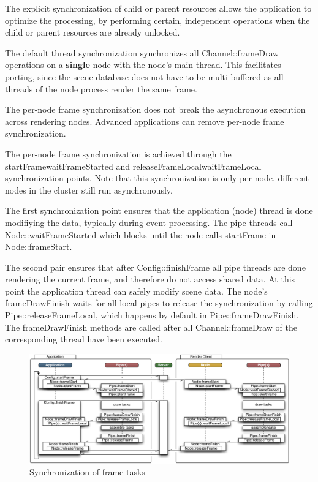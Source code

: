 \documentclass[10pt,a4]{scrartcl}
\begin{document}
The explicit synchronization of child or parent resources allows the
application to optimize the processing, by performing certain, independent
operations when the child or parent resources are already unlocked.

The default thread synchronization synchronizes all
\textsf{Channel::frameDraw} operations on a \textbf{single} node with
the node's main thread. This facilitates porting, since the scene
database does not have to be multi-buffered as all threads of the node
process render the same frame.

The per-node frame synchronization does not break the asynchronous
execution across rendering nodes.  Advanced applications can remove per-node
frame synchronization.

The per-node frame synchronization is achieved through the
\textsf{startFrame\textrightarrow wait\-Fra\-me\-Started} and
\textsf{releaseFrameLocal\textrightarrow waitFrameLocal} synchronization
points. Note that this synchronization is only per-node, different nodes
in the cluster still run asynchronously.

The first synchronization point ensures that the application (node)
thread is done modifiying the data, typically during event
processing. The pipe threads call \textsf{Node::waitFrameStarted} which
blocks until the node calls \textsf{startFrame} in
\textsf{Node::frame\-Start}.

The second pair ensures that after \textsf{Config::finishFrame} all pipe
threads are done rendering the current frame, and therefore do not
access shared data. At this point the application thread can safely
modify scene data. The node's \textsf{frameDrawFinish} waits for all
local pipes to release the synchronization by calling
\textsf{Pipe::release\-Fra\-me\-Lo\-cal}, which happens by default in
\textsf{Pipe::frameDrawFinish}. The \textsf{frameDrawFinish} methods are
called after all \textsf{Channel::frameDraw} of the corresponding thread
have been executed.

\begin{figure}[ht!]\center
  \includegraphics[width=\textwidth]{images/mainloop.pdf}
  {\caption{\small\label{fFrameSync}Synchronization of frame tasks}}
\end{figure}
\end{document}
